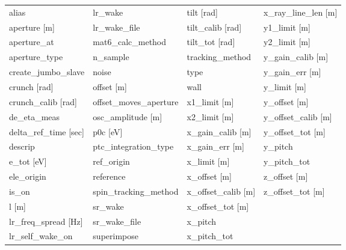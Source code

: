  \begin{tabular}{llll} \toprule
alias                          & lr_wake                        & tilt [rad]                     & x_ray_line_len [m]             \\
aperture [m]                   & lr_wake_file                   & tilt_calib [rad]               & y1_limit [m]                   \\
aperture_at                    & mat6_calc_method               & tilt_tot [rad]                 & y2_limit [m]                   \\
aperture_type                  & n_sample                       & tracking_method                & y_gain_calib [m]               \\
create_jumbo_slave             & noise                          & type                           & y_gain_err [m]                 \\
crunch [rad]                   & offset [m]                     & wall                           & y_limit [m]                    \\
crunch_calib [rad]             & offset_moves_aperture          & x1_limit [m]                   & y_offset [m]                   \\
de_eta_meas                    & osc_amplitude [m]              & x2_limit [m]                   & y_offset_calib [m]             \\
delta_ref_time [sec]           & p0c [eV]                       & x_gain_calib [m]               & y_offset_tot [m]               \\
descrip                        & ptc_integration_type           & x_gain_err [m]                 & y_pitch                        \\
e_tot [eV]                     & ref_origin                     & x_limit [m]                    & y_pitch_tot                    \\
ele_origin                     & reference                      & x_offset [m]                   & z_offset [m]                   \\
is_on                          & spin_tracking_method           & x_offset_calib [m]             & z_offset_tot [m]               \\
l [m]                          & sr_wake                        & x_offset_tot [m]               &                                \\
lr_freq_spread [Hz]            & sr_wake_file                   & x_pitch                        &                                \\
lr_self_wake_on                & superimpose                    & x_pitch_tot                    &                                \\
 \bottomrule
 \end{tabular}
 \vfill

